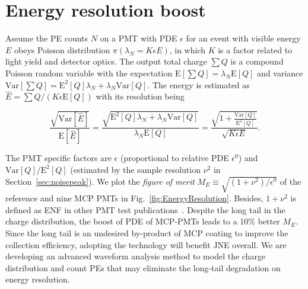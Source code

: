 \section{Energy resolution boost}
\label{Result}
Assume the PE counts $N$ on a PMT with PDE $\epsilon$ for an event with visible energy $E$ obeys Poisson distribution $\pi(\lambda_N=K\epsilon E)$, in which $K$ is a factor related to light yield and detector optics. The output total charge $\sum{Q}$ is a compound Poisson random variable with the expectation $\mathrm{E}[\sum{Q}]=\lambda_N\mathrm{E}[Q]$ and variance $\mathrm{Var}[\sum{Q}]=\mathrm{E}^2[Q]\lambda_N+\lambda_N\mathrm{Var}[Q]$. The energy is estimated as $\hat{E}=\sum{Q}/(K\epsilon\mathrm{E}[Q])$ with its resolution being

\begin{equation}
    \frac{\sqrt{\mathrm{Var}[\hat{E}]}}{\mathrm{E}[\hat{E}]}=\frac{\sqrt{\mathrm{E}^2[Q]\lambda_N+\lambda_N\mathrm{Var}[Q]}}{\lambda_N\mathrm{E}[Q]}=\frac{\sqrt{1+\frac{\mathrm{Var}[Q]}{\mathrm{E}^2[Q]}}}{\sqrt{K\epsilon E}}.
\end{equation}

The PMT specific factors are $\epsilon$ (proportional to relative PDE $\epsilon^0$) and $\mathrm{Var}[Q]/ \mathrm{E}^2[Q]$ (estimated by the sample resolution $\nu^2$ in Section~\ref{sec:noisepeak}).  We plot the \emph{figure of merit} $M_{E}\equiv\sqrt{({1+\nu^2})/{\epsilon^0}}$ of the reference and nine MCP PMTs in Fig.~\ref{fig:EnergyResolution}. Besides, $1+\nu^2$ is defined as ENF in other PMT test publications~\cite{JUNOMassTesting,ENF,ENFAuger}. Despite the long tail in the charge distribution, the boost of PDE of MCP-PMTs leads to a 10\% better $M_{E}$.  Since the long tail is an undesired by-product of MCP coating to improve the collection efficiency, adopting the technology will benefit JNE overall.  We are developing an advanced waveform analysis method to model the charge distribution and count PEs that may eliminate the long-tail degradation on energy resolution.

